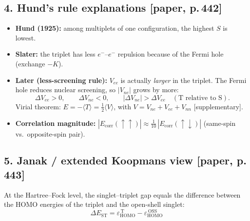 \subsection*{4. Hund's rule explanations [paper, p.\,442]}
\begin{itemize}
  \item \textbf{Hund (1925):} among multiplets of one configuration, the highest $S$ is lowest.
  \item \textbf{Slater:} the triplet has less $e^-$--$e^-$ repulsion because of the Fermi hole
        (exchange $-K$).
  \item \textbf{Later (less-screening rule):} $V_{ee}$ is actually \emph{larger} in the triplet.
        The Fermi hole reduces nuclear screening, so $|V_{ne}|$ grows by more:
        \begin{equation}
          \Delta V_{ee} > 0,\qquad \Delta V_{ne} < 0,\qquad |\Delta V_{ne}| > \Delta V_{ee}
          \quad(\text{T relative to S}).
        \end{equation}
        Virial theorem: $E = -\langle T\rangle = \tfrac12\langle V\rangle$, with
        $V = V_{ne}+V_{ee}+V_{nn}$ [supplementary].
  \item \textbf{Correlation magnitude:} $|E_{\text{corr}}(\uparrow\uparrow)| \approx
        \tfrac{1}{10}\,|E_{\text{corr}}(\uparrow\downarrow)|$ (same-spin vs.\ opposite-spin pair).
\end{itemize}

\subsection*{5. Janak / extended Koopmans view [paper, p.\,443]}
At the Hartree--Fock level, the singlet--triplet gap equals the difference between the HOMO
energies of the triplet and the open-shell singlet:
\begin{equation}
  \Delta E_{\mathrm{ST}} = \varepsilon^{\,\mathrm{T}}_{\mathrm{HOMO}} - \varepsilon^{\,\mathrm{OSS}}_{\mathrm{HOMO}}
\end{equation}


